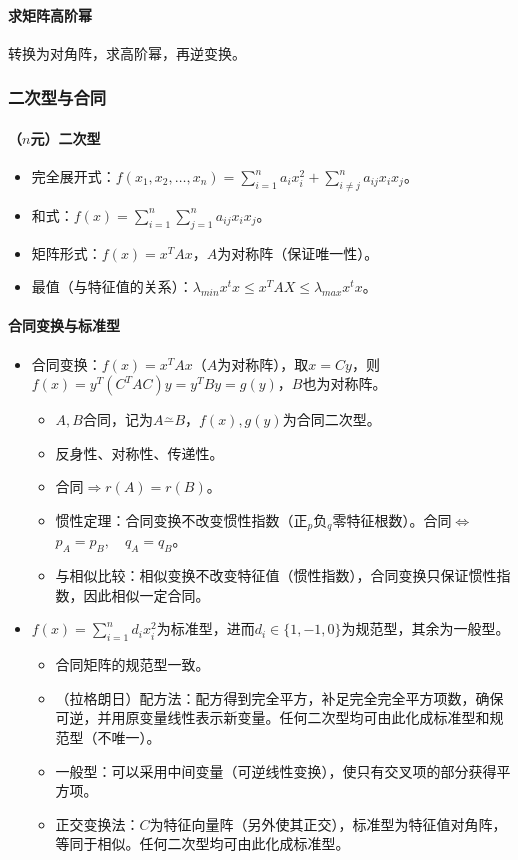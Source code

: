 \documentclass[
12pt, %
a4paper, 
oneside, %
]{scrartcl}
\begin{document}
\paragraph{求矩阵高阶幂}
转换为对角阵，求高阶幂，再逆变换。
\subsubsection[二次型与合同]{二次型与合同}
\paragraph{（$ n $元）二次型}
\begin{itemize}
\item 完全展开式：$ f(x_1, x_2, \dots, x_n) = \sum_{i = 1}^n a_i x_i^2 + \sum_{i \neq j}^n a_{ij} x_i x_j $。
\item 和式：$ f(x) = \sum_{i = 1}^n \sum_{j = 1}^n a_{ij} x_i x_j $。
\item 矩阵形式：$ f(x) = x^T A x $，$ A $为对称阵（保证唯一性）。
\item 最值（与特征值的关系）：$ \lambda_{min} x^t x \leq x^T A X \leq \lambda_{max} x^t x $。
\end{itemize}
\paragraph{合同变换与标准型}
\begin{itemize}
\item 合同变换：$ f(x) = x^T A x $（$ A $为对称阵），取$ x = Cy $，则$ f(x) = y^T(C^T A C)y = y^T B y = g(y) $，$ B $也为对称阵。
\begin{itemize}
\item $ A, B $合同，记为$ A \overset{\sim}{-} B $，$ f(x), g(y) $为合同二次型。
\item 反身性、对称性、传递性。
\item 合同$ \Rightarrow $$ r(A) = r(B) $。
\item 惯性定理：合同变换不改变惯性指数（正$ _p $负$ _q $零特征根数）。合同$ \Leftrightarrow $$ p_A = p_B, \quad q_A = q_B $。
\item 与相似比较：相似变换不改变特征值（惯性指数），合同变换只保证惯性指数，因此相似一定合同。
\end{itemize}
\item $ f(x) = \sum_{i = 1}^n d_i x_i^2 $为标准型，进而$ d_i \in \{1, -1, 0\} $为规范型，其余为一般型。
\begin{itemize}
\item 合同矩阵的规范型一致。
\item （拉格朗日）配方法：配方得到完全平方，补足完全完全平方项数，确保可逆，并用原变量线性表示新变量。任何二次型均可由此化成标准型和规范型（不唯一）。
\item 一般型：可以采用中间变量（可逆线性变换），使只有交叉项的部分获得平方项。
\item 正交变换法：$ C $为特征向量阵（另外使其正交），标准型为特征值对角阵，等同于相似。任何二次型均可由此化成标准型。
\end{itemize}
\end{itemize}
\end{document}
